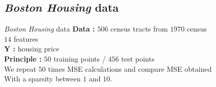 \documentclass[unknownkeysallowed]{beamer}
\begin{document}
\subsection{\textit{Boston Housing} data}
\label{sub:Boston Housing data}

\begin{frame}{\textit{Boston Housing} data}
\textbf{Data : }$506$ census tracts from $1970$ census\\
\hspace{1.2cm}       $14$ features\\
\vspace{0.5cm}
\textbf{Y : }housing price\\
\vspace{0.5cm}
\textbf{Principle : }$50$ training points / $456$ test points\\
We repeat $50$ times MSE calculations and compare MSE obtained\\
With a sparsity between $1$ and $10$.
\end{frame}
\end{document}
